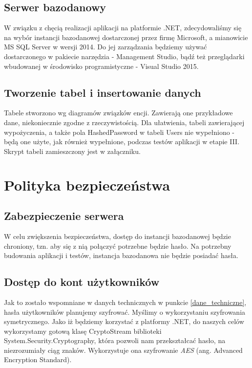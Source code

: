 \documentclass{article}
\begin{document}
\subsection{Serwer bazodanowy}
W związku z chęcią realizacji aplikacji na platformie .NET, zdecydowaliśmy się na wybór instancji bazodanowej dostarczonej przez firmę Microsoft, a mianowicie MS SQL Server w wersji 2014. Do jej zarządzania będziemy używać dostarczonego w pakiecie narzędzia - Management Studio, bądź też przeglądarki wbudowanej w środowisko programistyczne - Visual Studio 2015.
\subsection{Tworzenie tabel i insertowanie danych}
Tabele stworzono wg diagramów związków encji. Zawierają one przykładowe dane, niekoniecznie zgodne z rzeczywistością. Dla ułatwienia, tabeli zawierającej wypożyczenia, a także pola HashedPassword w tabeli Users nie wypełniono - będą one użyte, jak również wypełnione, podczas testów aplikacji w etapie III. Skrypt tabeli zamieszczony jest w załączniku.
\section{Polityka bezpieczeństwa}
\subsection{Zabezpieczenie serwera}
W celu zwiększenia bezpieczeństwa, dostęp do instancji bazodanowej będzie chroniony, tzn. aby się z nią połączyć potrzebne będzie hasło. Na potrzebny budowania aplikacji i testów, instancja bazodanowa nie będzie posiadać hasła. 
\subsection{Dostęp do kont użytkowników}
Jak to zostało wspomniane w danych technicznych w punkcie \ref{dane_techniczne}, hasła użytkowników planujemy szyfrować. Myślimy o wykorzystaniu szyfrowania symetrycznego. Jako iż będziemy korzystać z platformy .NET, do naszych celów wykorzystamy gotową klasę CryptoStream biblioteki System.Security.Cryptography, która pozwoli nam przekształcać hasło, na niezrozumiały ciąg znaków. Wykorzystuje ona szyfrowanie \textit{AES} (ang. Advanced Encryption Standard). 
\end{document}

